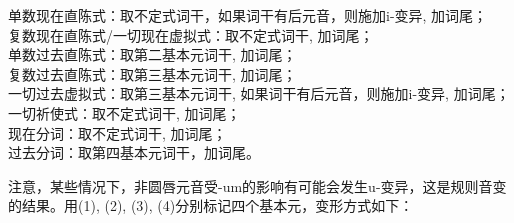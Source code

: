 \begin{info}
    单数现在直陈式：取不定式词干，如果词干有后元音，则施加i-变异, 加词尾； \\
    复数现在直陈式/一切现在虚拟式：取不定式词干, 加词尾；          \\
    单数过去直陈式：取第二基本元词干, 加词尾；                \\
    复数过去直陈式：取第三基本元词干, 加词尾；                \\
    一切过去虚拟式：取第三基本元词干, 如果词干有后元音，则施加i-变异,
    加词尾；                                   \\
    一切祈使式：取不定式词干, 加词尾；                    \\
    现在分词：取不定式词干, 加词尾；                     \\
    过去分词：取第四基本元词干，加词尾。
\end{info}

注意，某些情况下，非圆唇元音受-um的影响有可能会发生u-变异，这是规则音变的结果。用(1), (2), (3), (4)分别标记四个基本元，变形方式如下：

